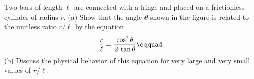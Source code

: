 Two bars of length $\ell$ are connected with a hinge and
placed on a frictionless cylinder of radius $r$. (a) Show that
the angle $\theta$ shown in the figure is related to the unitless
ratio $r/\ell$ by the equation 
\begin{equation*}
         \frac{r}{\ell} = \frac{\cos^2\theta}{2\:\tan\theta}\eqquad.
\end{equation*}\hwendpart
(b) Discuss the physical behavior of this equation for very
large and very small values of $r/\ell$.
